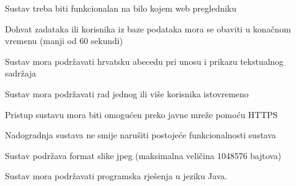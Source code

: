 			\begin{packed_item}
				\item Sustav treba biti funkcionalan na bilo kojem web pregledniku 
				\item Dohvat zadataka ili korisnika iz baze podataka mora se obaviti u konačnom vremenu (manji od 60 sekundi)
				\item Sustav mora podržavati hrvatsku abecedu pri unosu i prikazu tekstualnog sadržaja
				\item Sustav mora podržavati rad jednog ili više korisnika istovremeno  
				\item Pristup sustavu mora biti omogućen preko javne mreže pomoću HTTPS
				\item Nadogradnja sustava ne smije narušiti postojeće funkcionalnosti sustava 
				\item Sustav podržava format slike jpeg (maksimalna veličina 1048576 bajtova)
				\item Sustav mora podržavati programska rješenja u jeziku Java.
			\end{packed_item}
				
			
			 
			 
	